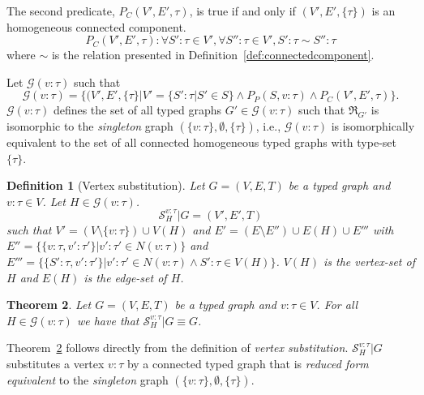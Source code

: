 \documentclass[preprint,12pt]{elsarticle}
\theoremstyle{plain}
\newtheorem{theorem}{Theorem}[section]
\newtheorem{definition}[theorem]{Definition}
\newcommand\tyv[2]{#1\!\!:\!\!#2}
\begin{document}
The second predicate, $P_C(V',E',\tau)$, is true if and only if $(V',E',\{\tau\})$ is an 
homogeneous connected component.
\[
P_C(V',E',\tau): \forall \tyv{S'}{\tau}\in V', \forall \tyv{S''}{\tau}\in V',
    \tyv{S'}{\tau}\sim\tyv{S''}{\tau}
\]
where $\sim$ is the relation presented in Definition~\ref{def:connectedcomponent}.

Let $\mathcal{G}(\tyv{v}{\tau})$ such that
\[
\mathcal{G}(\tyv{v}{\tau}) = \{(V',E',\{\tau\}|
    V'=\{\tyv{S'}{\tau}|S'\in S\}\wedge P_P(S, \tyv{v}{\tau}) \wedge P_C(V',E',\tau)\}.
\]
$\mathcal{G}(\tyv{v}{\tau})$ defines the set of all typed graphs $G'\in\mathcal{G}(\tyv{v}{\tau})$
such that $\Re_{G'}$ is isomorphic to the \textit{singleton} graph $(\{\tyv{v}{\tau}\},\emptyset,\{\tau\})$,
i.e., $\mathcal{G}(\tyv{v}{\tau})$ is isomorphically equivalent to the set of all connected homogeneous typed graphs with type-set $\{\tau\}$.

\begin{definition}[Vertex substitution]
Let $G = (V,E,T)$ be a typed graph and $\tyv{v}{\tau}\in V$.
Let $H\in\mathcal{G}(\tyv{v}{\tau})$.
\[
\mathcal{S}^{v:\tau}_H|G = (V',E',T)
\]
such that
$V' = (V\setminus\{\tyv{v}{\tau}\})\cup V(H)$
and
$E' = (E\setminus E'')\cup E(H)\cup E'''$
with
$E'' = \{ \{\tyv{v}{\tau},\tyv{v'}{\tau'}\}| \tyv{v'}{\tau'}\in N(\tyv{v}{\tau})\}$
and
$E''' = \{ \{\tyv{S'}{\tau},\tyv{v'}{\tau'}\}|\tyv{v'}{\tau'}\in N(\tyv{v}{\tau}) \wedge\allowbreak\tyv{S'}{\tau}\in V(H)\}$.
$V(H)$ is the vertex-set of $H$ and $E(H)$ is the edge-set of $H$.
\end{definition}

\begin{theorem}\label{theorem:substEquiv}
Let $G = (V,E,T)$ be a typed graph and $\tyv{v}{\tau}\in V$.
For all $H\in\mathcal{G}(\tyv{v}{\tau})$ we have that $\mathcal{S}^{v:\tau}_H|G \equiv G$.
\end{theorem}

Theorem~\ref{theorem:substEquiv} follows directly from the definition of \textit{vertex substitution}.
$\mathcal{S}^{v:\tau}_H|G$ substitutes a vertex $\tyv{v}{\tau}$ by a connected typed graph
that is \textit{reduced form equivalent} to the \textit{singleton} graph $(\{\tyv{v}{\tau}\},\emptyset,\{\tau\})$.
\end{document}
